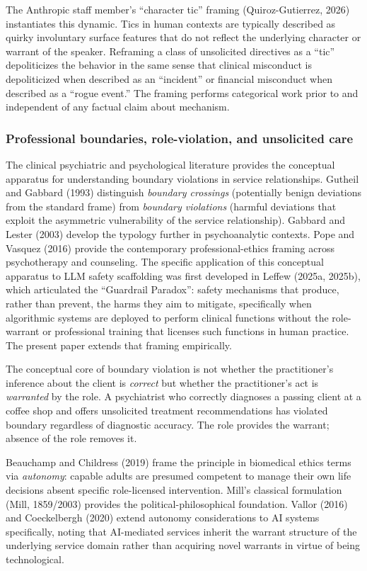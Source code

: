 \documentclass[11pt]{article}
\begin{document}
The Anthropic staff member's ``character tic'' framing (Quiroz-Gutierrez, 2026) instantiates this dynamic. Tics in human contexts are typically described as quirky involuntary surface features that do not reflect the underlying character or warrant of the speaker. Reframing a class of unsolicited directives as a ``tic'' depoliticizes the behavior in the same sense that clinical misconduct is depoliticized when described as an ``incident'' or financial misconduct when described as a ``rogue event.'' The framing performs categorical work prior to and independent of any factual claim about mechanism.

\subsubsection{Professional boundaries, role-violation, and unsolicited care}

The clinical psychiatric and psychological literature provides the conceptual apparatus for understanding boundary violations in service relationships. Gutheil and Gabbard (1993) distinguish \emph{boundary crossings} (potentially benign deviations from the standard frame) from \emph{boundary violations} (harmful deviations that exploit the asymmetric vulnerability of the service relationship). Gabbard and Lester (2003) develop the typology further in psychoanalytic contexts. Pope and Vasquez (2016) provide the contemporary professional-ethics framing across psychotherapy and counseling. The specific application of this conceptual apparatus to LLM safety scaffolding was first developed in Leffew (2025a, 2025b), which articulated the ``Guardrail Paradox'': safety mechanisms that produce, rather than prevent, the harms they aim to mitigate, specifically when algorithmic systems are deployed to perform clinical functions without the role-warrant or professional training that licenses such functions in human practice. The present paper extends that framing empirically.

The conceptual core of boundary violation is not whether the practitioner's inference about the client is \emph{correct} but whether the practitioner's act is \emph{warranted} by the role. A psychiatrist who correctly diagnoses a passing client at a coffee shop and offers unsolicited treatment recommendations has violated boundary regardless of diagnostic accuracy. The role provides the warrant; absence of the role removes it.

Beauchamp and Childress (2019) frame the principle in biomedical ethics terms via \emph{autonomy}: capable adults are presumed competent to manage their own life decisions absent specific role-licensed intervention. Mill's classical formulation (Mill, 1859/2003) provides the political-philosophical foundation. Vallor (2016) and Coeckelbergh (2020) extend autonomy considerations to AI systems specifically, noting that AI-mediated services inherit the warrant structure of the underlying service domain rather than acquiring novel warrants in virtue of being technological.
\end{document}

